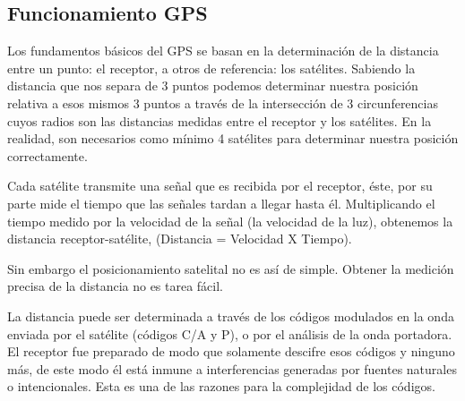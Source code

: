 \subsection{Funcionamiento GPS}

Los fundamentos básicos del GPS se basan en la determinación de la distancia entre un punto: el receptor, a otros de referencia: los satélites. Sabiendo la distancia que nos separa de 3 puntos podemos determinar nuestra posición relativa a esos mismos 3 puntos a través de la intersección de 3 circunferencias cuyos radios son las distancias medidas entre el receptor y los satélites. En la realidad, son necesarios como mínimo 4 satélites para determinar nuestra posición correctamente. 

Cada satélite transmite una señal que es recibida por el receptor, éste, por su parte mide el tiempo que las señales tardan a llegar hasta él. Multiplicando el tiempo medido por la velocidad de la señal (la velocidad de la luz), obtenemos la distancia receptor-satélite, (Distancia = Velocidad X Tiempo).

Sin embargo el posicionamiento satelital no es así de simple. Obtener la medición precisa de la distancia no es tarea fácil.

La distancia puede ser determinada a través de los códigos modulados en la onda enviada por el satélite  (códigos C/A y P), o por el análisis de la onda portadora. El receptor fue preparado de modo que solamente descifre esos códigos y ninguno más, de este modo él está inmune a interferencias generadas por fuentes naturales o intencionales. Esta es una de las razones para la complejidad de los códigos.  \cite{GPS}